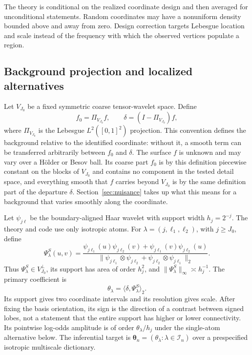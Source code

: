 \documentclass[11pt]{article}
\theoremstyle{definition}
\newcommand{\1}{\mathbf 1}\newcommand{\op}{\operatorname}
\newcommand{\cI}{\mathcal I}\newcommand{\cJ}{\mathcal J}\newcommand{\cF}{\mathcal F}
\newcommand{\btheta}{\boldsymbol\theta}
\begin{document}
The theory is conditional on the realized coordinate design and then averaged for unconditional statements.  Random coordinates may have a nonuniform density bounded above and away from zero.  Design correction targets Lebesgue location and scale instead of the frequency with which the observed vertices populate a region.

\subsection{Background projection and localized alternatives}

Let $V_{J_0}$ be a fixed symmetric coarse tensor-wavelet space.  Define
\begin{equation}
  f_0=\Pi_{V_{J_0}}f,\qquad \delta=(I-\Pi_{V_{J_0}})f,          \label{eq:projection}
\end{equation}
where $\Pi_{V_{J_0}}$ is the Lebesgue $L^2([0,1]^2)$ projection.  This convention
defines the background relative to the identified coordinate: without it, a smooth
term can be transferred arbitrarily between $f_0$ and $\delta$.  The surface $f$
is unknown and may vary over a H\"older or Besov ball.  Its coarse part $f_0$ is by
this definition piecewise constant on the blocks of $V_{J_0}$ and contains no
component in the tested detail space, and everything smooth that $f$ carries
beyond $V_{J_0}$ is by the same definition part of the departure $\delta$.
Section~\ref{sec:nuisance} takes up what this means for a background that
varies smoothly along the coordinate.

Let $\psi_{j\ell}$ be the boundary-aligned Haar wavelet with support width
$h_j=2^{-j}$.  The theory and code use only isotropic atoms.  For
$\lambda=(j,\ell_1,\ell_2)$, with $j\ge J_0$, define
\begin{equation}
 \Psi_\lambda^S(u,v)=
 \frac{\psi_{j\ell_1}(u)\psi_{j\ell_2}(v)
      +\psi_{j\ell_1}(v)\psi_{j\ell_2}(u)}
 {\|\psi_{j\ell_1}\otimes\psi_{j\ell_2}
  +\psi_{j\ell_2}\otimes\psi_{j\ell_1}\|_2} .             \label{eq:symatom}
\end{equation}
Thus $\Psi_\lambda^S\in V_{J_0}^{\perp}$, its support has area of order
$h_j^2$, and $\|\Psi_\lambda^S\|_\infty\asymp h_j^{-1}$.
The primary coefficient is
\begin{equation}
  \theta_\lambda=\langle\delta,\Psi_\lambda^S\rangle_2.       \label{eq:theta}
\end{equation}
Its support gives two coordinate intervals and its resolution gives scale.  After
fixing the basis orientation, its sign is the direction of a contrast between signed
lobes, not a statement that the entire support has higher or lower connectivity.  Its
pointwise log-odds amplitude is of order $\theta_\lambda/h_j$ under the single-atom
alternative below.  The inferential target is
$\btheta_n=(\theta_\lambda:\lambda\in\cI_n)$ over a prespecified isotropic
multiscale dictionary.
\end{document}
